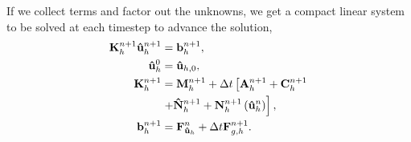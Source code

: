 \documentclass[../../thesis.tex]{subfiles}
\newcommand{\dt}{\ensuremath{\Delta t}}
\newcommand{\Ah}[1]{\ensuremath{\vb{#1}^{n+1}_h}}
\begin{document}
If we collect terms and factor out the unknowns, we get a compact linear system to be solved at each timestep to advance the solution,
\begin{subequations}
    \begin{align}
        \label{eq:1d_fom_linear_system_timestep}
        \vb{K}_h^{n+1} \vb{\hat{u}}_h^{n+1} &= \vb{b}_h^{n+1}, 
        \\
        \vb{\hat{u}}_h^{0} &= \vb{\hat{u}}_{h,0},
        \\
        \vb{K}_h^{n+1} &= \Ah{M} + \dt \left[\Ah{A} + \Ah{C} \right. 
        \nonumber 
        \\
                        &\left. + \Ah{\hat{N}} + \Ah{N}\left(\vb{\hat{u}}_{h}^{n}\right)\right],
        \\
        \vb{b}_h^{n+1} &= \vb{F}_{\vb{\hat{u}}_h}^{n} + \dt \vb{F}_{g,h}^{n+1}.
    \end{align}
\end{subequations}



\end{document}
